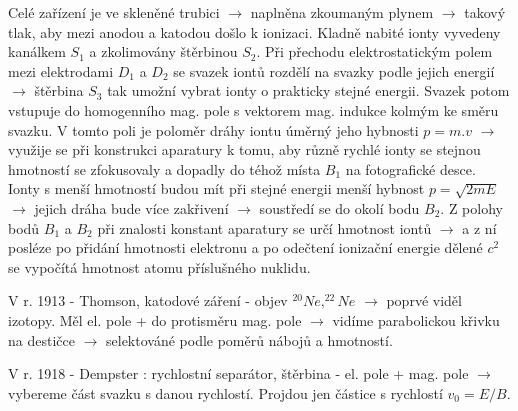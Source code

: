 \documentclass[../../main.tex]{subfiles}
\begin{document}
Celé zařízení je ve skleněné trubici $\rightarrow$ naplněna zkoumaným plynem $\rightarrow$  takový tlak, aby mezi anodou a katodou došlo k ionizaci. Kladně nabité ionty vyvedeny kanálkem $S_1$ a zkolimovány štěrbinou $S_2$. Při přechodu elektrostatickým polem mezi elektrodami $D_1$ a $D_2$ se svazek iontů rozdělí na svazky podle jejich energií $\rightarrow$ štěrbina $S_3$ tak umožní vybrat ionty o prakticky stejné energii. Svazek potom vstupuje do homogenního mag. pole s vektorem mag. indukce kolmým ke směru svazku. V tomto poli je poloměr dráhy iontu úměrný jeho hybnosti $ p= m.v$ $\rightarrow$ využije se při konstrukci aparatury k tomu, aby různě rychlé ionty se stejnou hmotností se zfokusovaly a dopadly do téhož místa $B_1$ na fotografické desce. Ionty s menší hmotností budou mít při stejné energii menší hybnost $p = \sqrt{2mE}$ $\rightarrow$ jejich dráha bude více zakřivení $\rightarrow$ soustředí se do okolí bodu $B_2$. Z polohy bodů $B_1$ a $B_2$ při znalosti konstant aparatury se určí hmotnost iontů $\rightarrow$ a z ní posléze po přidání hmotnosti elektronu a po odečtení ionizační energie dělené $c^2$ se vypočítá hmotnost atomu příslušného nuklidu.

V r. 1913 - Thomson, katodové záření - objev $^{20}Ne , ^{22}Ne$ $\rightarrow$ poprvé viděl izotopy. Měl el. pole + do protisměru mag. pole $\rightarrow$ vidíme parabolickou křivku na destičce $\rightarrow$ selektováné podle poměrů nábojů a hmotností.

V r. 1918 - Dempster : rychlostní separátor, štěrbina - el. pole + mag. pole $\rightarrow$ vybereme část svazku s danou rychlostí. Projdou jen částice s rychlostí $v_0 = E/B$.
\end{document}
